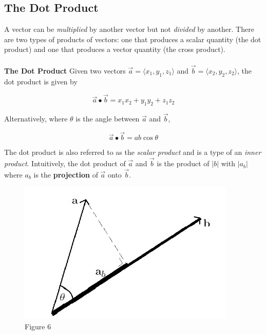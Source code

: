     \subsection{The Dot Product}
        A vector can be \emph{multiplied} by another vector but not \emph{divided} by another.
        There are two types of products of vectors: one that produces a scalar quantity
        (the dot product) and one that produces a vector quantity (the cross product). \\\\

        \noindent \textbf{The Dot Product} Given two vectors $\overrightarrow{a}=\langle x_1, y_1, z_1\rangle$
        and $\overrightarrow{b}=\langle x_2, y_2, z_2\rangle$, the dot product is given by

        \begin{equation*}
            \overrightarrow{a}\bullet\overrightarrow{b}=x_1x_2+y_1y_2+z_1z_2
        \end{equation*}

        \noindent Alternatively, where $\theta$ is the angle between $\overrightarrow{a}$
        and $\overrightarrow{b}$,

        \begin{equation*}
            \overrightarrow{a}\bullet\overrightarrow{b}=ab\cos{\theta}
        \end{equation*}

        \noindent The dot product is also referred to as the \emph{scalar product} and is a type
        of an \emph{inner product}. Intuitively, the dot product of $\overrightarrow{a}$ and
        $\overrightarrow{b}$ is the product of $|b|$ with $|a_b|$ where $a_b$ is the
        \textbf{projection} of $\overrightarrow{a}$ onto $\overrightarrow{b}$.

        \begin{figure}[h]
            \centering
            \includegraphics[scale=0.4]{Resources/Unit3Vectors/dotproduct1.PNG}
            \caption*{Figure 6}
        \end{figure}

